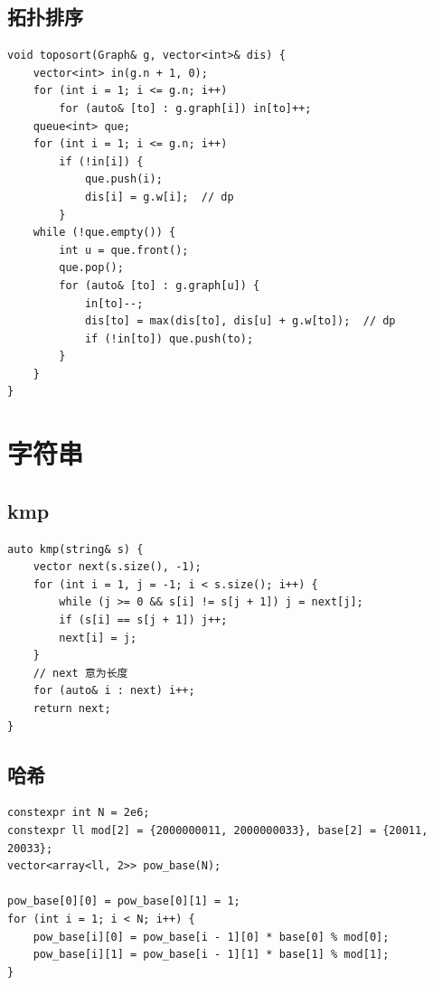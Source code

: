 \documentclass[UTF8]{ctexart}
\begin{document}
\begin{sloppypar}
\subsection{拓扑排序}

\begin{lstlisting}[style=cpp]
void toposort(Graph& g, vector<int>& dis) {
    vector<int> in(g.n + 1, 0);
    for (int i = 1; i <= g.n; i++)
        for (auto& [to] : g.graph[i]) in[to]++;
    queue<int> que;
    for (int i = 1; i <= g.n; i++)
        if (!in[i]) {
            que.push(i);
            dis[i] = g.w[i];  // dp
        }
    while (!que.empty()) {
        int u = que.front();
        que.pop();
        for (auto& [to] : g.graph[u]) {
            in[to]--;
            dis[to] = max(dis[to], dis[u] + g.w[to]);  // dp
            if (!in[to]) que.push(to);
        }
    }
}
\end{lstlisting}

\section{字符串}

\subsection{kmp}

\begin{lstlisting}[style=cpp]
auto kmp(string& s) {
    vector next(s.size(), -1);
    for (int i = 1, j = -1; i < s.size(); i++) {
        while (j >= 0 && s[i] != s[j + 1]) j = next[j];
        if (s[i] == s[j + 1]) j++;
        next[i] = j;
    }
    // next 意为长度
    for (auto& i : next) i++;
    return next;
}
\end{lstlisting}

\subsection{哈希}

\begin{lstlisting}[style=cpp]
constexpr int N = 2e6;
constexpr ll mod[2] = {2000000011, 2000000033}, base[2] = {20011, 20033};
vector<array<ll, 2>> pow_base(N);

pow_base[0][0] = pow_base[0][1] = 1;
for (int i = 1; i < N; i++) {
    pow_base[i][0] = pow_base[i - 1][0] * base[0] % mod[0];
    pow_base[i][1] = pow_base[i - 1][1] * base[1] % mod[1];
}


\end{lstlisting}
\end{sloppypar}
\end{document}

